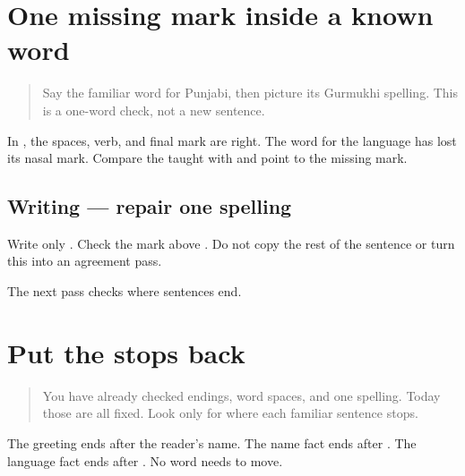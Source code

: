 \section[\texorpdfstring{\pa{ਪੰਜਾਬੀ} (panjābī)}{ਪੰਜਾਬੀ (panjābī)}]{One missing mark inside a known word}

\label{lesson:PA-W12-spelling-repair}



\begin{quote}
Say the familiar word for Punjabi, then picture its Gurmukhi spelling. This is a one-word check, not a new sentence.
\end{quote}

\begin{tcolorbox}[breakable,skin=enhanced,colback=orange!6,colframe=orange!45!black,boxrule=0.5pt,arc=1mm,left=6pt,right=6pt,top=4pt,bottom=4pt,fonttitle=\bfseries,title={Read this}]
In \textbf{   }, the spaces, verb, and final mark are right. The word for the language has lost its nasal mark. Compare the taught \textbf{} with \textbf{} and point to the missing mark.
\end{tcolorbox}

\subsection*{Writing — repair one spelling}
Write only \textbf{}. Check the mark above \textbf{}. Do not copy the rest of the sentence or turn this into an agreement pass.

\begin{tcolorbox}[breakable,colback=teal!4,colframe=teal!35!black,title={Before you move on}]
The next pass checks where sentences end.
\end{tcolorbox}
\section[\texorpdfstring{\pa{।} (sentence boundary)}{। (sentence boundary)}]{Put the stops back}

\label{lesson:PA-W12-punctuation-repair}



\begin{quote}
You have already checked endings, word spaces, and one spelling. Today those are all fixed. Look only for where each familiar sentence stops.
\end{quote}

\begin{tcolorbox}[breakable,skin=enhanced,colback=orange!6,colframe=orange!45!black,boxrule=0.5pt,arc=1mm,left=6pt,right=6pt,top=4pt,bottom=4pt,fonttitle=\bfseries,title={Read this}]
\begin{quote}
         
\end{quote}

The greeting ends after the reader's name. The name fact ends after \textbf{}. The language fact ends after \textbf{}. No word needs to move.
\end{tcolorbox}

